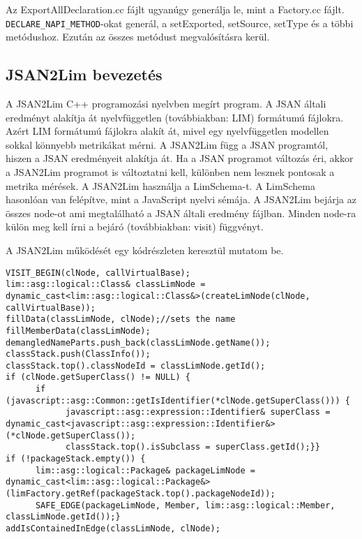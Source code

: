 \noindent

Az ExportAllDeclaration.cc fájlt ugyanúgy generálja le, mint a Factory.cc fájlt. \texttt{DECLARE\_NAPI\_METHOD}-okat generál, a setExported, setSource, setType és a többi metódushoz.
Ezután az összes metódust megvalósításra kerül.

\subsection{JSAN2Lim bevezetés}

\noindent

A JSAN2Lim C++ programozási nyelvben megírt program. A JSAN általi eredményt alakítja át nyelvfüggetlen (továbbiakban: LIM) formátumú fájlokra.
Azért LIM formátumú fájlokra alakít át, mivel egy nyelvfüggetlen modellen sokkal könnyebb metrikákat mérni.
A JSAN2Lim függ a JSAN programtól, hiszen a JSAN eredményeit alakítja át.
Ha a JSAN programot változás éri, akkor a JSAN2Lim programot is változtatni kell, különben nem lesznek pontosak a metrika mérések.
A JSAN2Lim használja a LimSchema-t. A LimSchema hasonlóan van felépítve, mint a JavaScript nyelvi sémája.
A JSAN2Lim bejárja az összes node-ot ami megtalálható a JSAN általi eredmény fájlban.
Minden node-ra külön meg kell írni a bejáró (továbbiakban: visit) függvényt.

\noindent

A JSAN2Lim működését egy kódrészleten keresztül mutatom be.
\begin{lstlisting}[caption={ClassDeclaration Visitor}, label={lst:classdeclaration_visitor}, language={CStyle}]
VISIT_BEGIN(clNode, callVirtualBase);
lim::asg::logical::Class& classLimNode = dynamic_cast<lim::asg::logical::Class&>(createLimNode(clNode, callVirtualBase));
fillData(classLimNode, clNode);//sets the name
fillMemberData(classLimNode);
demangledNameParts.push_back(classLimNode.getName());
classStack.push(ClassInfo());
classStack.top().classNodeId = classLimNode.getId();
if (clNode.getSuperClass() != NULL) {
      if (javascript::asg::Common::getIsIdentifier(*clNode.getSuperClass())) {
            javascript::asg::expression::Identifier& superClass = dynamic_cast<javascript::asg::expression::Identifier&>(*clNode.getSuperClass());
            classStack.top().isSubclass = superClass.getId();}}
if (!packageStack.empty()) {
      lim::asg::logical::Package& packageLimNode = dynamic_cast<lim::asg::logical::Package&>(limFactory.getRef(packageStack.top().packageNodeId));
      SAFE_EDGE(packageLimNode, Member, lim::asg::logical::Member, classLimNode.getId());}
addIsContainedInEdge(classLimNode, clNode);
\end{lstlisting}

